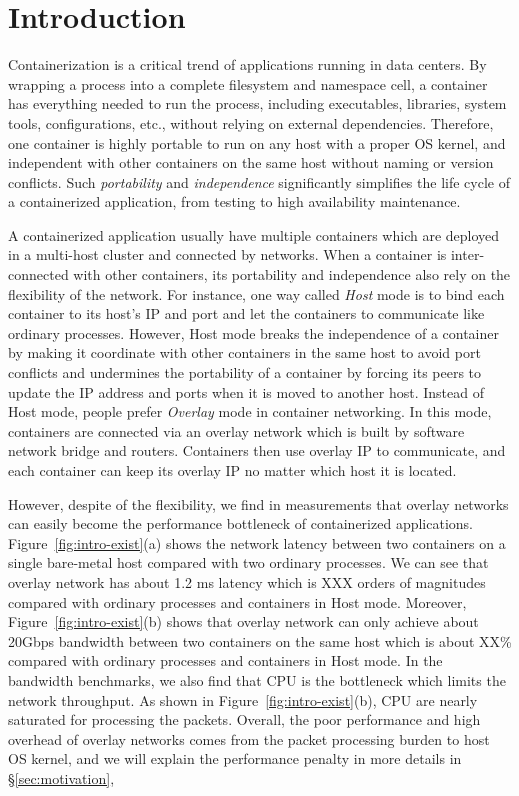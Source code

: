 \section{Introduction} \label{sec:introduction}


Containerization is a critical trend of applications running in data centers.
By wrapping a process into a complete filesystem and namespace cell, a container
has everything needed to run the process, including executables, libraries, system
tools, configurations, etc., without relying on external dependencies. 
Therefore, one container
is highly portable to run on any host with a proper OS kernel, and independent
with other containers on the same host without naming or version conflicts.
Such {\em portability} and {\em independence} significantly simplifies 
the life cycle of
a containerized application, from testing to high availability maintenance.

A containerized application usually have multiple containers which are 
deployed in a multi-host cluster and connected by networks. When a container
is inter-connected with other containers, its portability and independence 
also rely on the flexibility of the network. For instance, one way called 
{\em Host} mode  is to bind each container to its host's IP
and port and let the containers to communicate like ordinary processes.
However, Host mode breaks the independence of a container by making it
coordinate with other containers in the same host to avoid port conflicts
and undermines the portability of a container by forcing its peers to
update the IP address and ports when it is moved to another host.
Instead of Host mode, people prefer {\em Overlay} mode in container networking.
In this mode, containers are connected via an overlay network which 
is built by software network bridge and routers. Containers then use
overlay IP to communicate, and each container can keep its overlay IP
no matter which host it is located. 

However, despite of the flexibility, we find in measurements that overlay
networks can easily become the performance bottleneck of containerized
applications. 
Figure~\ref{fig:intro-exist}(a) shows the network latency between two containers
on a single bare-metal host compared with two ordinary processes. 
We can see that overlay network has about 1.2 ms latency which is XXX orders
of magnitudes compared with ordinary processes and containers in Host mode.
Moreover, Figure~\ref{fig:intro-exist}(b) shows that overlay network can only
achieve about 20Gbps bandwidth between two containers on the same host 
which is about XX\% compared with ordinary processes and containers in Host mode.
In the bandwidth benchmarks, we also find that CPU is the bottleneck which 
limits the network throughput. As shown in Figure~\ref{fig:intro-exist}(b),
CPU are nearly saturated for processing the packets. Overall, the poor
performance and high overhead of overlay networks comes from the packet processing
burden to host OS kernel, and we will explain the performance penalty in more details in \S\ref{sec:motivation},

